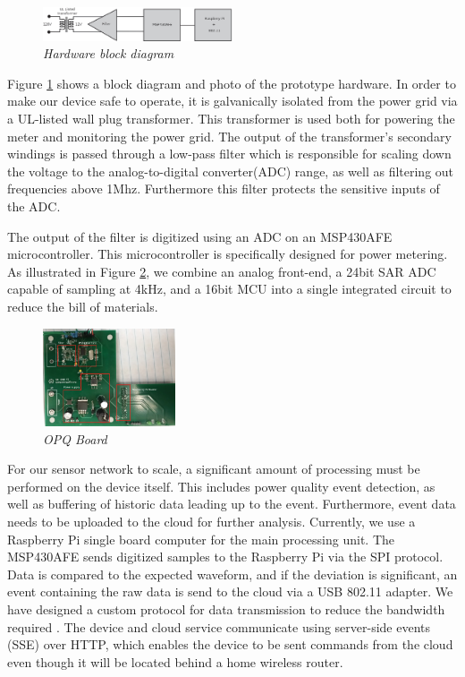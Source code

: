 \documentclass[11pt]{article}
\begin{document}
\begin{figure}
  \includegraphics[width=0.5\textwidth]{figures/hardware-block-diagram.eps}
  \caption{\em \small Hardware block diagram}
  \label{fig:hardware-block-diagram}
\end{figure} 

Figure \ref{fig:hardware-block-diagram} shows a block diagram and photo of the prototype hardware. In order to make our device safe to operate, it is galvanically isolated from the power grid via a UL-listed wall plug transformer. This transformer is used both for powering the meter and monitoring the power grid. The output of the transformer's secondary windings is passed through a low-pass filter which is responsible for scaling down the voltage to the analog-to-digital converter(ADC) range, as well as filtering out frequencies above 1Mhz. Furthermore this filter protects the sensitive inputs of the ADC.

The output of the filter is digitized using an ADC on an MSP430AFE microcontroller. This microcontroller is specifically designed for power metering. As illustrated in Figure \ref{fig:board}, we combine an analog front-end, a 24bit SAR ADC capable of sampling at 4kHz, and a 16bit MCU into a single integrated circuit to reduce the bill of materials. 

\begin{figure}
  \includegraphics[width=0.35\textwidth]{figures/board3.eps}
  \caption{\em \small OPQ Board}
  \label{fig:board}
\end{figure} 

For our sensor network to scale, a significant amount of processing must be performed on the device itself. This includes power quality event detection, as well as buffering of historic data leading up to the event. Furthermore, event data needs to be uploaded to the cloud for further analysis. Currently, we use a Raspberry Pi single board computer for the main processing unit. The MSP430AFE sends digitized samples to the Raspberry Pi via the SPI protocol. Data is compared to the expected waveform, and if the deviation is significant, an event containing the raw data is send to the cloud via a USB 802.11 adapter. We have designed a custom protocol for data transmission to reduce the bandwidth required \cite{opq-protocol}. The device and cloud service communicate using server-side events (SSE) over HTTP, which enables the device to be sent commands from the cloud even though it will be located behind a home wireless router.
\end{document}
